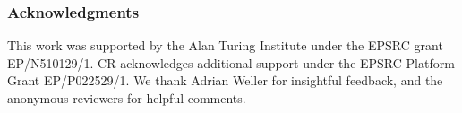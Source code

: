 \documentclass{article}
\begin{document}
\subsubsection*{Acknowledgments}

This work was supported by the Alan Turing Institute under the EPSRC
grant EP/N510129/1. CR acknowledges additional support under the EPSRC Platform Grant EP/P022529/1.
We thank Adrian Weller for insightful feedback, and the anonymous reviewers for helpful comments.




\newpage

\end{document}

